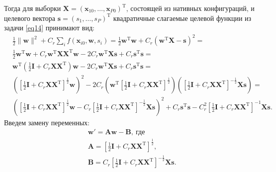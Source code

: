 \documentclass[preprint,12pt,3p]{elsarticle}
\begin{document}
Тогда для выборки ${\mathbf{X}}=({\mathbf{x}}_{10}, \dots, {\mathbf{x}}_{P0})^{\text{T}}$, состоящей из нативных конфигураций, и целевого вектора  $\mathbf{s}=(s_1,\dots,s_P)^{\text{T}}$ квадратичные слагаемые целевой функции из задачи \eqref{eq14} принимают вид:
\begin{equation*}
\begin{aligned}
& \frac{1}{2} \|{\mathbf{w}}\|^2 + C_{r}\sum\limits_{i} f({\mathbf{x}}_{i0},{\mathbf{w}}, s_i)=\frac{1}{2}{\mathbf{w}}^{\text{T}}{\mathbf{w}}+C_{r}({\mathbf{w}}^{\text{T}}{\mathbf{X}} - \mathbf{s})^2 =\\
& \frac{1}{2}{\mathbf{w}}^{\text{T}}{\mathbf{w}}+C_{r}{\mathbf{w}}^{\text{T}}{\mathbf{X}}{\mathbf{X}}^{\text{T}}{\mathbf{w}}-2C_{r}{\mathbf{w}}^{\text{T}}{\mathbf{X}}\mathbf{s} + C_{r}\mathbf{s}^{\text{T}}\mathbf{s}=\\
& {\mathbf{w}}^{\text{T}}\left(\frac{1}{2}\mathbf{I} + C_{r}{\mathbf{X}}{\mathbf{X}}^{\text{T}}\right){\mathbf{w}}-2C_{r}{\mathbf{w}}^{\text{T}}{\mathbf{X}}\mathbf{s}+C_{r}\mathbf{s}^{\text{T}}\mathbf{s}=\\
& \left(\left[\frac{1}{2}\mathbf{I} + C_{r}{\mathbf{X}}{\mathbf{X}}^{\text{T}}\right]^{\frac{1}{2}}{\mathbf{w}}\right)^2- 2C_{r}\left({\mathbf{w}}^{\text{T}}\left[\frac{1}{2}\mathbf{I} + C_{r}{\mathbf{X}}{\mathbf{X}}^{\text{T}}\right]^{\frac{1}{2}}\right)\left(\left[\frac{1}{2}\mathbf{I} + C_{r}{\mathbf{X}}{\mathbf{X}}^{\text{T}}\right]^{-\frac{1}{2}}{\mathbf{X}}\mathbf{s}\right)=\\
& \left(\left[\frac{1}{2}\mathbf{I} + C_{r}{\mathbf{X}}{\mathbf{X}}^{\text{T}}\right]^{\frac{1}{2}}{\mathbf{w}} - C_r\left[\frac{1}{2}\mathbf{I} + C_{r}{\mathbf{X}}{\mathbf{X}}^{\text{T}}\right]^{-\frac{1}{2}}{\mathbf{X}}\mathbf{s}\right)^2 + C_r\mathbf{s}^{\text{T}}\mathbf{s}-C_r^2\left[\frac{1}{2}\mathbf{I} + C_{r}{\mathbf{X}}{\mathbf{X}}^{\text{T}}\right]^{-1}{\mathbf{X}}\mathbf{s}.
\end{aligned}
\end{equation*}
Введем замену переменных:
\begin{equation}\label{eq16}
\begin{aligned}
& \mathbf{w}'= \mathbf{A}{\mathbf{w}} - \mathbf{B}, \ \text{где} \\
& \mathbf{A}=\left[\frac{1}{2}\mathbf{I} + C_{r}{\mathbf{X}}{\mathbf{X}}^{\text{T}}\right]^{\frac{1}{2}},\\
& \mathbf{B}=C_r\left[\frac{1}{2}\mathbf{I} + C_{r}{\mathbf{X}}{\mathbf{X}}^{\text{T}}\right]^{-\frac{1}{2}}{\mathbf{X}}\mathbf{s}.
\end{aligned}
\end{equation}
\end{document}
